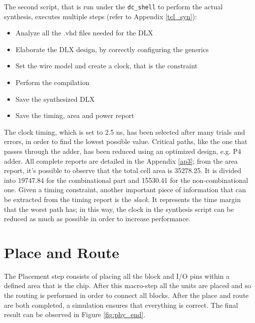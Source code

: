 The second script, that is run under the \texttt{dc\_shell} to perform the actual synthesis, executes multiple steps (refer to Appendix \ref{tcl_syn}):
\begin{itemize}
    \itemsep0sp
    \item Analyze all the .vhd files needed for the DLX
    \item Elaborate the DLX design, by correctly configuring the generics
    \item Set the wire model and create a clock, that is the constraint
    \item Perform the compilation
    \item Save the synthesized DLX
    \item Save the timing, area and power report 
\end{itemize}
The clock timing, which is set to 2.5 ns, has been selected after many trials and errors, in order to find the lowest possible value. Critical paths, like the one that passes through the adder, has been reduced using an optimized design, e.g. P4 adder.\newline\newline
All complete reports are detailed in the Appendix \ref{ap3}; from the area report, it's possible to observe that the total cell area is 35278.25. It is divided into 19747.84 for the combinational part and 15530.41 for the non-combinational one.\newline\newline
Given a timing constraint, another important piece of information that can be extracted from the timing report is the \textit{slack}. It represents the time margin that the worst path has; in this way, the clock in the synthesis script can be reduced as much as possible in order to increase performance.

\section{Place and Route}
The Placement step consists of placing all the block and I/O pins within a defined area that is the chip. After this macro-step all the units are placed and so the routing is performed in order to connect all blocks. After the place and route are both completed, a simulation ensures that everything is correct. The final result can be observed in Figure \ref{fig:phy_end}.


